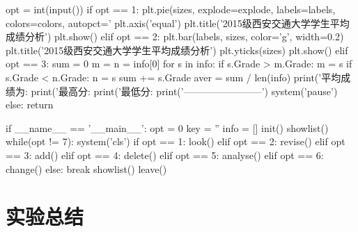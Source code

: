 \documentclass{article}
\begin{document}
\begin{python}
    opt = int(input())
    if opt == 1:
        plt.pie(sizes, explode=explode, labels=labels, colors=colors, autopct='%
        plt.axis('equal')
        plt.title('2015级西安交通大学学生平均成绩分析\n')
        plt.show()
    elif opt == 2:
        plt.bar(labels, sizes, color='g', width=0.2)
        plt.title('2015级西安交通大学学生平均成绩分析')
        plt.yticks(sizes)
        plt.show()
    elif opt == 3:
        sum = 0
        m = n = info[0]
        for s in info:
            if s.Grade > m.Grade:
                m = s
            if s.Grade < n.Grade:
                n = s
            sum += s.Grade
        aver = sum / len(info)
        print('平均成绩为:%
        print('最高分:%
        print('最低分:%
        print('------------------------')
        system('pause')
    else:
        return

if __name__ == '__main__':
    opt = 0
    key = ''
    info = []
    init()
    showlist()
    while(opt != 7):
        system('cls')
        if opt == 1:
            look()
        elif opt == 2:
            revise()
        elif opt == 3:
            add()
        elif opt == 4:
            delete()
        elif opt == 5:
            analyse()
        elif opt == 6:
            change()
        else:
            break
        showlist()
    leave()

\end{python}





\section{实验总结}
\end{document}
